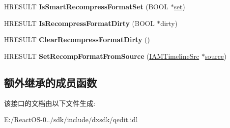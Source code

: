 \begin{DoxyCompactItemize}
H\+R\+E\+S\+U\+LT {\bfseries Is\+Smart\+Recompress\+Format\+Set} (B\+O\+OL $\ast$\hyperlink{classset}{set})
\item 
\mbox{\label{interface_i_a_m_timeline_group_ab7949fe33dee7d60bc81d6f36672f167}} 
H\+R\+E\+S\+U\+LT {\bfseries Is\+Recompress\+Format\+Dirty} (B\+O\+OL $\ast$dirty)
\item 
\mbox{\label{interface_i_a_m_timeline_group_a4f50cc6a55a334ef343df16ed07113cb}} 
H\+R\+E\+S\+U\+LT {\bfseries Clear\+Recompress\+Format\+Dirty} ()
\item 
\mbox{\label{interface_i_a_m_timeline_group_a1eeb20492a4d0182bb6bd389690c42ae}} 
H\+R\+E\+S\+U\+LT {\bfseries Set\+Recomp\+Format\+From\+Source} (\hyperlink{interface_i_a_m_timeline_src}{I\+A\+M\+Timeline\+Src} $\ast$\hyperlink{structsource}{source})
\end{DoxyCompactItemize}
\subsection*{额外继承的成员函数}


该接口的文档由以下文件生成\+:\begin{DoxyCompactItemize}
\item 
E\+:/\+React\+O\+S-\/0../sdk/include/dxsdk/qedit.\+idl\end{DoxyCompactItemize}
